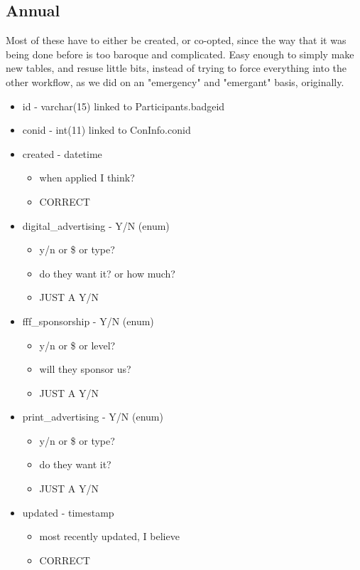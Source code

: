 \documentclass[captions=tablesignature]{scrartcl}
\begin{document}
\subsection{Annual}
\label{sec-2-2}
Most of these have to either be created, or co-opted, since the way
that it was being done before is too baroque and complicated.  Easy
enough to simply make new tables, and resuse little bits, instead
of trying to force everything into the other workflow, as we did on
an "emergency" and "emergant" basis, originally.
\begin{itemize}
\item id - varchar(15)
\label{sec-2-2-1}
linked to Participants.badgeid

\item conid - int(11)
\label{sec-2-2-2}
linked to ConInfo.conid

\item created - datetime
\label{sec-2-2-3}
\begin{itemize}
\item when applied I think?
\item CORRECT
\end{itemize}

\item digital\_advertising - Y/N (enum)
\label{sec-2-2-4}
\begin{itemize}
\item y/n or \$ or type?
\item do they want it? or how much?
\item JUST A Y/N
\end{itemize}

\item fff\_sponsorship - Y/N (enum)
\label{sec-2-2-5}
\begin{itemize}
\item y/n or \$ or level?
\item will they sponsor us?
\item JUST A Y/N
\end{itemize}

\item print\_advertising - Y/N (enum)
\label{sec-2-2-6}
\begin{itemize}
\item y/n or \$ or type?
\item do they want it?
\item JUST A Y/N
\end{itemize}

\item updated - timestamp
\label{sec-2-2-7}
\begin{itemize}
\item most recently updated, I believe
\item CORRECT
\end{itemize}


\end{itemize}
\end{document}
